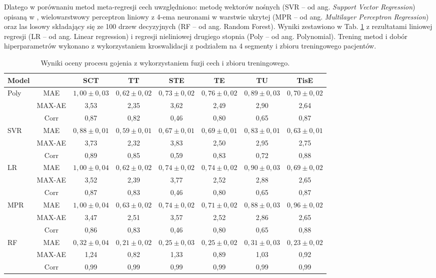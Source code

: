Dlatego w porównaniu metod meta-regresji cech uwzględniono: metodę wektorów nośnych (SVR -- od ang. \textit{Support Vector Regression}) opisaną w \cite{SVR_drucker}, wielowarstwowy perceptron liniowy z 4-ema neuronami w warstwie ukrytej (MPR -- od ang. \textit{Multilayer Perceptron Regression}) oraz las losowy składający się ze 100 drzew decyzyjnych (RF -- od ang. Random Forest). Wyniki zestawiono w Tab. \ref{tab:trainset} z rezultatami liniowej regresji (LR -- od ang. Linear regression) i regresji nieliniowej drugiego stopnia (Poly -- od ang. Polynomial). Trening metod i dobór hiperparametrów wykonano z wykorzystaniem kroswalidacji z podziałem na 4 segmenty i zbioru treningowego pacjentów.

\begin{table}[]
	\caption{Wyniki oceny procesu gojenia z wykorzystaniem fuzji cech i zbioru treningowego.}
	\scriptsize
	\begin{center}
		\begin{tabular}{lc||c|c|c|c|c|c}
			\textbf{Model} & & \textbf{SCT} & \textbf{TT} & \textbf{STE} & \textbf{TE} & \textbf{TU} & \textbf{TisE}\\ 
			
			\hline \hline
			\multirow{3}{*}{Poly}
			& MAE & $1,00\pm0,03$ & $0,62\pm0,02$ & $0,73\pm0,02$ & $0,76\pm0,02$ & $0,89\pm0,03$ & $0,70\pm0,02$\\
			& MAX-AE & 3,53 & 2,35 & 3,62 & 2,49 & 2,90 & 2,64 \\
			& Corr   & 0,87 & 0,82 & 0,46 & 0,80 & 0,65 & 0,87 \\
			\hline
			\multirow{3}{*}{SVR}
			& MAE & $0,88\pm0,01$ & $0,59\pm0,01$ & $0,67\pm0,01$ & $0,69\pm0,01$ & $0,83\pm0,01$ & $0,63\pm0,01$\\
			& MAX-AE & 3,73 & 2,32 & 3,83 & 2,50 & 2,95 & 2,75 \\
			& Corr   & 0,89 & 0,85 & 0,59 & 0,83 & 0,72 & 0,88 \\
			\hline
			\multirow{3}{*}{LR}
			& MAE & $1,00\pm0,04$ & $0,62\pm0,02$ & $0,74\pm0,02$ & $0,74\pm0,02$ & $0,90\pm0,03$ & $0,69\pm0,02$\\
			& MAX-AE & 3,52 & 2,39 & 3,77 & 2,52 & 2,88 & 2,65 \\
			& Corr   & 0,87 & 0,83 & 0,46 & 0,80 & 0,65 & 0,87 \\
			\hline
			\multirow{3}{*}{MPR}
			& MAE & $1,00\pm0,04$ & $0,63\pm0,02$ & $0,74\pm0,02$ & $0,71\pm0,02$ & $0,88\pm0,03$ & $0,96\pm0,02$\\
			& MAX-AE & 3,47 & 2,51 & 3,57 & 2,52 & 2,86 & 2,65 \\
			& Corr   & 0,86 & 0,83 & 0,46 & 0,80 & 0,65 & 0,88 \\
			\hline
			 \multirow{3}{*}{RF}
			 & MAE & $0,32\pm0,04$ & $0,21\pm0,02$ & $0,25\pm0,03$ & $0,25\pm0,02$ & $0,31\pm0,03$ & $0,23\pm0,02$\\
			 & MAX-AE & 1,24 & 0,82 & 1,33 & 0,89 & 1,03 & 0,92 \\
			 & Corr   & 0,99 & 0,99 & 0,99 & 0,99 & 0,99 & 0,99 \\
			 \hline
		\end{tabular}
	\end{center}
	\label{tab:trainset}
\end{table}

